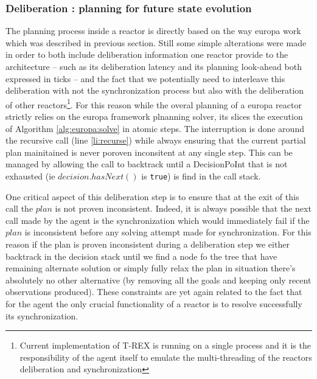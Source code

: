 \subsubsection{Deliberation : planning for future state evolution}
\label{sec:arch:plan}

The planning process inside a reactor is directly based on the way
europa work which was described in previous section. Still some simple
alterations were made in  order to both include deliberation
information one reactor provide to the architecture -- such as its
deliberation latency and its planning look-ahead both expressed in 
ticks -- and the fact that we potentially need to interleave this
deliberation with not the synchronization process but also with 
the deliberation of other reactors\footnote{Current implementation of
  T-REX is running on a single process and it is the responsibility of
  the agent itself to emulate the multi-threading of the reactors
  deliberation and synchronization}. For this reason while the overal
planning of a europa reactor strictly relies on the europa framework
plnanning solver, its slices the execution of Algorithm
\ref{alg:europa:solve} in atomic steps. The interruption is done
around the recursive call (line \ref{li:recurse}) while always
ensuring that the current partial plan mainitained is never poroven
inconsitent at any single step. This can be managed by allowing the
call to backtrack until a DecisionPoInt that is not exhausted (ie
$decision.hasNext()$ is \texttt{true}) is find in the call stack. 

One critical aspect of this deliberation step is to ensure that at the
exit of this call the $plan$ is not proven inconsistent. Indeed, it is
always possible that the next call made by the agent is the
synchronization which would immediately fail if the $plan$ is
inconsistent before any solving attempt made for synchronization. 
For this reason if the plan is proven inconsistent during a
deliberation step we either backtrack in the decision stack until we
find a node fo the tree that have remaining alternate solution or
simply fully relax the plan in situation there's absolutely no other
alternative  (by removing all the goals and keeping
only recent observations produced). These constraints are yet again
related to the fact that for the agent the only crucial functionality
of a reactor is to resolve successfully its synchronization. 


